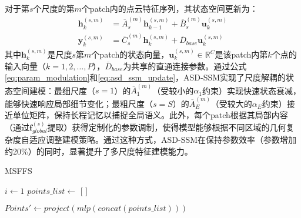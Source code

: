 \documentclass[preprint,12pt]{elsarticle}
\begin{document}
对于第$s$个尺度的第$m$个patch内的点云特征序列，其状态空间更新为：
\begin{equation}
	\begin{aligned}
		\mathbf{h}_k^{(s,m)} &= \overline{A}_s^{(m)} \mathbf{h}_{k-1}^{(s,m)} + \overline{B}_s^{(m)} \mathbf{u}_k^{(s,m)} \\
		\mathbf{y}_k^{(s,m)} &= \overline{C}_s^{(m)} \mathbf{h}_k^{(s,m)} + \overline{D}_{base} \mathbf{u}_k^{(s,m)}
	\end{aligned}
	\label{eq:asd_ssm_update}
\end{equation}
其中$\mathbf{h}_k^{(s,m)}$是尺度$s$第$m$个patch的状态向量，$\mathbf{u}_k^{(s,m)} \in \mathbb{R}^C$是该patch内第$k$个点的输入向量（$k=1,2,\ldots,P$），$\overline{D}_{base}$为共享的直通连接参数。通过公式\ref{eq:param_modulation}和\ref{eq:asd_ssm_update}，ASD-SSM实现了尺度解耦的状态空间建模：最细尺度（$s=1$）的$\overline{A}_1^{(m)}$（受较小的$\alpha_1$约束）实现快速状态衰减，能够快速响应局部细节变化；最粗尺度（$s=S$）的$\overline{A}_E^{(m)}$（受较大的$\alpha_E$约束）接近单位矩阵，保持长程记忆以捕捉全局语义。此外，每个patch根据其局部内容（通过$\mathbf{f}_{global}^{(s)}$提取）获得定制化的参数调制，使得模型能够根据不同区域的几何复杂度自适应调整建模策略。通过这种方式，ASD-SSM在保持参数效率（参数增加约20\%）的同时，显著提升了多尺度特征建模能力。



	\begin{algorithm}[H]
		\SetAlgoLined %
		\caption{MSFFS} %
		
		$i \leftarrow 1$ \;
		 $points\_list \leftarrow$ [ ]\;
		
		$Points' \leftarrow project(mlp(concat(points\_list)))$\;
		
	\end{algorithm}
\end{document}
